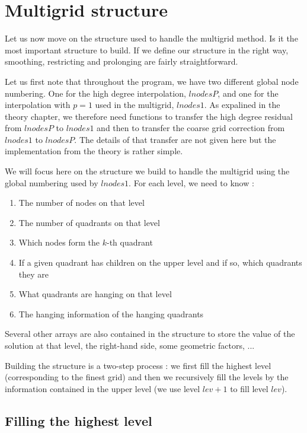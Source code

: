 \section{Multigrid structure}

Let us now move on the structure used to handle the multigrid method. Is it the most important structure to build. If we define our structure in the right way, smoothing, restricting and prolonging are fairly straightforward.

Let us first note that throughout the program, we have two different global node numbering. One for the high degree interpolation, $lnodesP$, and one for the interpolation with $p=1$ used in the multigrid, $lnodes1$. As expalined in the theory chapter, we therefore need functions to transfer the high degree residual from $lnodesP$ to $lnodes1$ and then to transfer the coarse grid correction from $lnodes1$ to $lnodesP$. The details of that transfer are not given here but the implementation from the theory is rather simple. 

We will focus here on the structure we build to handle the multigrid using the global numbering used by $lnodes1$. For each level, we need to know : 

\begin{enumerate}
\item The number of nodes on that level
\item The number of quadrants on that level
\item Which nodes form the $k$-th quadrant
\item If a given quadrant has children on the upper level and if so, which quadrants they are
\item What quadrants are hanging on that level
\item The hanging information of the hanging quadrants
\end{enumerate} 

Several other arrays are also contained in the structure to store the value of the solution at that level, the right-hand side, some geometric factors, ...

Building the structure is a two-step process : we first fill the highest level (corresponding to the finest grid) and then we recursively fill the levels by the information contained in the upper level (we use level $lev+1$ to fill level $lev$).

\subsection{Filling the highest level}

